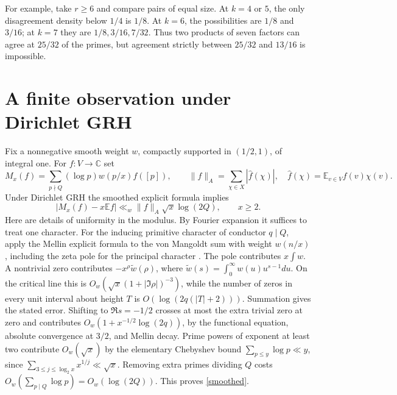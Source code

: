 \documentclass[11pt,letterpaper]{article}
\newcommand{\E}{\mathbb E}
\begin{document}
For example, take \(r\ge6\) and compare pairs of equal size. At \(k=4\) or \(5\), the only disagreement density below \(1/4\) is \(1/8\). At \(k=6\), the possibilities are \(1/8\) and \(3/16\); at \(k=7\) they are \(1/8,3/16,7/32\). Thus two products of seven factors can agree at \(25/32\) of the primes, but agreement strictly between \(25/32\) and \(13/16\) is impossible.

\newpage
\section{A finite observation under Dirichlet GRH}
Fix a nonnegative smooth weight \(w\), compactly supported in \((1/2,1)\), of integral one. For \(f:V\to\mathbb C\) set
\[
 M_x(f)=\sum_{p\nmid Q}(\log p)w(p/x)f([p]),\qquad
 \|f\|_A=\sum_{\chi\in X}|\widehat f(\chi)|,
 \quad \widehat f(\chi)=\E_{v\in V}f(v)\chi(v).
\]
Under Dirichlet GRH the smoothed explicit formula implies
\begin{equation}
 |M_x(f)-x\E f|\ll_w \|f\|_A\sqrt{x}\log(2Q),\qquad x\ge2.
 \label{smoothed}
\end{equation}
Here are details of uniformity in the modulus. By Fourier expansion it suffices to treat one character. For the inducing primitive character of conductor \(q\mid Q\), apply the Mellin explicit formula to the von Mangoldt sum with weight \(w(n/x)\), including the zeta pole for the principal character \cite[Ch.~5]{IK}. The pole contributes \(x\int w\). A nontrivial zero contributes \(-x^\rho\widetilde w(\rho)\), where \(\widetilde w(s)=\int_0^\infty w(u)u^{s-1}du\). On the critical line this is \(O_w(\sqrt x(1+|\Im\rho|)^{-3})\), while the number of zeros in every unit interval about height \(T\) is \(O(\log(2q(|T|+2)))\). Summation gives the stated error. Shifting to \(\Re s=-1/2\) crosses at most the extra trivial zero at zero and contributes \(O_w(1+x^{-1/2}\log(2q))\), by the functional equation, absolute convergence at \(3/2\), and Mellin decay. Prime powers of exponent at least two contribute \(O_w(\sqrt{x})\) by the elementary Chebyshev bound \(\sum_{p\le y}\log p\ll y\), since \(\sum_{3\le j\le\log_2 x}x^{1/j}\ll\sqrt{x}\). Removing extra primes dividing \(Q\) costs \(O_w(\sum_{p\mid Q}\log p)=O_w(\log(2Q))\). This proves \eqref{smoothed}.
\end{document}
